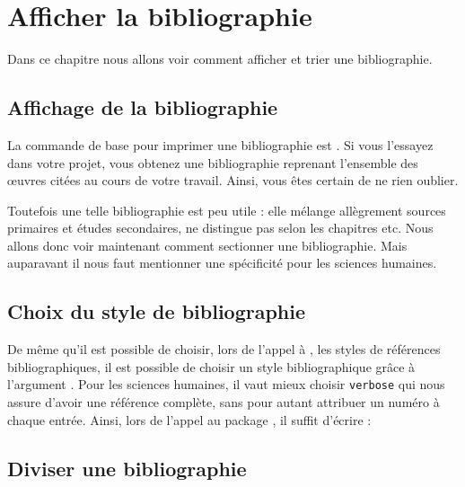 \chapter{Afficher la bibliographie}

\begin{prealable}

Dans ce chapitre nous allons voir comment afficher et trier une bibliographie.
\end{prealable}


\section{Affichage de la bibliographie}

La commande de base  pour imprimer une bibliographie est . Si vous l'essayez dans votre projet, vous obtenez une bibliographie reprenant l'ensemble des œuvres  citées au cours de votre travail. Ainsi, vous êtes certain de ne rien oublier.

Toutefois une telle bibliographie est peu utile : elle mélange allègrement sources primaires et études secondaires, ne distingue pas selon les chapitres etc. Nous allons donc voir maintenant comment sectionner une bibliographie. Mais auparavant il nous faut mentionner une spécificité pour les sciences humaines.



\section{Choix du style de bibliographie}

De même qu'il est possible de choisir, lors de l'appel à , les styles de références bibliographiques, il est possible de choisir un style bibliographique grâce à l'argument . Pour les sciences humaines, il vaut mieux choisir \verb|verbose| qui nous assure d'avoir une référence complète, sans pour autant attribuer un numéro à chaque entrée.
Ainsi, lors de l'appel au package , il suffit d'écrire :

\begin{latexcode}
\usepackage[bibstyle=verbose,...]{biblatex}

\end{latexcode}

\section{Diviser une bibliographie}


